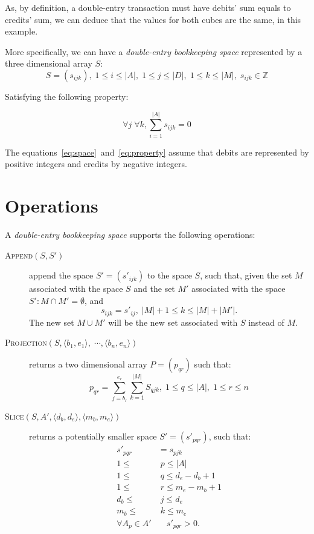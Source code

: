\documentclass{article}
\begin{document}
As, by definition, a double-entry transaction must have debits' sum
equals to credits' sum, we can deduce that the values for both
cubes are the same, in this example.

More specifically, we can have a \emph{double-entry bookkeeping space} 
represented by a three dimensional array $S$:
\begin{equation}
	\label{eq:space}
	S = \left(s_{ijk}\right), 
	\; 1 \leq i \leq |A|, \; 1 \leq j \leq |D|, \; 1 \leq k \leq |M|, 
	\; s_{ijk} \in \mathbb{Z}
\end{equation}

Satisfying the following property:

\begin{equation}
	\label{eq:property}
	\forall j \; \forall k, \sum_{i=1}^{|A|}{s_{ijk}} = 0
\end{equation}

The equations~\eqref{eq:space}~and~\eqref{eq:property}
assume that debits are represented by positive integers
and credits by negative integers.

\section{Operations}

A \emph{double-entry bookkeeping space} supports the following operations:

\begin{description}
	\item[\textsc{Append}$(S,S')$] append the space
	$S'=\left(s'_{ijk}\right)$ to the space $S$,
		such that, given the set $M$ associated with the space $S$ and
		the set $M'$ associated with the space $S':
		M \cap M' = \emptyset$, and
		\[
			s_{ijk} = s'_{ij}, \; |M|+1 \leq k \leq |M|+|M'|.
		\]
		The new set $M \cup M'$ will be the new set associated with $S$
		instead of $M$.

	\item[\textsc{Projection}$(S, \langle b_1, e_1 \rangle, \; \cdots,
		\langle b_n, e_n \rangle)$] 
		returns a two dimensional array $P=\left(p_{qr}\right)$ such that:
		\[
			p_{qr} = \sum_{j=b_r}^{e_r}{\sum_{k=1}^{|M|}{S_{qjk}}}, 
				\; 1 \leq q \leq |A|, \; 1 \leq r \leq n
		\]

	\item[\textsc{Slice}$(S, A', \langle d_b,d_e \rangle, \langle m_b,m_e \rangle)$] 
		returns a potentially smaller space $S'=\left(s'_{pqr}\right)$, such that:
			\begin{align*}
				s'_{pqr} & = s_{pjk} \\
				1 \leq & \; p \leq |A| \\
				1 \leq & \; q \leq d_e-d_b+1 \\
				1 \leq & \; r \leq m_e-m_b+1 \\
				d_b \leq & \; j \leq d_e \\
				m_b \leq & \; k \leq m_e \\
				\forall A_{p} \in A' & \quad s'_{pqr} > 0.
			\end{align*}

\end{description}
\end{document}
